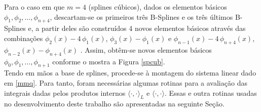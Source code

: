 \documentclass[12pt,a4paper]{report}
\begin{document}
Para o caso em que $m=4$ (splines cúbicos), dados os elementos básicos $\phi_1,\phi_2,\dots,\phi_{n+4}$, descartam-se os primeiros três B-Splines e os três últimos B-Splines e, a partir deles são construídos 4 novos elementos básicos através das  combinações  $\phi_2(x) - 4\,\phi_1(x)$, $\phi_3(x)-\phi_1(x)$ e $\phi_{n-1}(x) - 4\,\phi_{n+4}(x)$, $\phi_{n-2}(x)-\phi_{n+4}(x)$	. Assim, obtêm-se novos elementos básicos $\phi_0,\phi_1,\dots,\phi_{n+1}$ conforme o mostra a Figura \ref{spcub}.\medskip\\
Tendo em mãos a base de splines, procede-se à montagem do sistema linear dado em \eqref{mmq}. Para tanto, foram necessárias algumas rotinas para a avaliação das integrais dadas pelos produtos internos $\langle \cdot,\cdot\rangle _L$ e $\langle \cdot,\cdot\rangle$. Essas e outra rotinas usadas no desenvolvimento deste trabalho são apresentadas na seguinte Seção.
\end{document}
